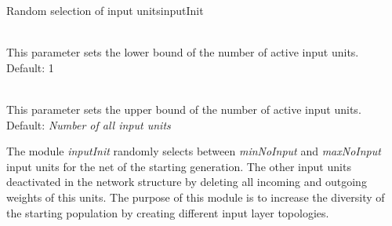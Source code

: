 \begin{moduledoc}{Random selection of input units}{inputInit}
  \item[\KeyWord{minNoInput} \optParam{ x } ]~\\
    This parameter sets the lower bound of the number of active input units.\\
    Default: 1 
  \item[\KeyWord{maxNoInput} \optParam{ x } ]~\\
    This parameter sets the upper bound of the number of active input units.\\
    Default: {\it Number of all input units}
\end{moduledoc}

The module {\it inputInit} randomly selects between {\it minNoInput} and
{\it maxNoInput} input units for the net of the starting generation.
The other input units  deactivated in the network structure by deleting 
all incoming and outgoing weights of this units.
The purpose of this module is to increase the diversity of the starting population
by creating different input layer topologies.
